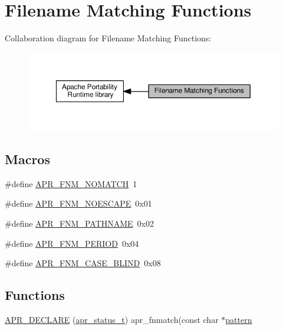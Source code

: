\hypertarget{group__apr__fnmatch}{}\section{Filename Matching Functions}
\label{group__apr__fnmatch}
Collaboration diagram for Filename Matching Functions\+:
\nopagebreak
\begin{figure}[H]
\begin{center}
\leavevmode
\includegraphics[width=350pt]{group__apr__fnmatch}
\end{center}
\end{figure}
\subsection*{Macros}
\begin{DoxyCompactItemize}
\item 
\#define \hyperlink{group__apr__fnmatch_gaea769621807400e4c741e7deddf6c3df}{A\+P\+R\+\_\+\+F\+N\+M\+\_\+\+N\+O\+M\+A\+T\+CH}~1
\item 
\#define \hyperlink{group__apr__fnmatch_gae12c1286631f316647be6dc007170630}{A\+P\+R\+\_\+\+F\+N\+M\+\_\+\+N\+O\+E\+S\+C\+A\+PE}~0x01
\item 
\#define \hyperlink{group__apr__fnmatch_ga0d421a2cef68cb590f958b5de6c7fe1b}{A\+P\+R\+\_\+\+F\+N\+M\+\_\+\+P\+A\+T\+H\+N\+A\+ME}~0x02
\item 
\#define \hyperlink{group__apr__fnmatch_ga4806f936b6eacc59dfed831d67b750ef}{A\+P\+R\+\_\+\+F\+N\+M\+\_\+\+P\+E\+R\+I\+OD}~0x04
\item 
\#define \hyperlink{group__apr__fnmatch_ga5cee1c0a917a283a193721d11160b502}{A\+P\+R\+\_\+\+F\+N\+M\+\_\+\+C\+A\+S\+E\+\_\+\+B\+L\+I\+ND}~0x08
\end{DoxyCompactItemize}
\subsection*{Functions}
\begin{DoxyCompactItemize}
\item 
\hyperlink{group__apr__fnmatch_gaaa224db42fb6857159b6b7049451ddea}{A\+P\+R\+\_\+\+D\+E\+C\+L\+A\+RE} (\hyperlink{group__apr__errno_gaa5105fa83cc322f09382292db8b47593}{apr\+\_\+status\+\_\+t}) apr\+\_\+fnmatch(const char $\ast$\hyperlink{pcretest_8txt_a14415789461ee2ace28e34eea786cc6c}{pattern}
\end{DoxyCompactItemize}
